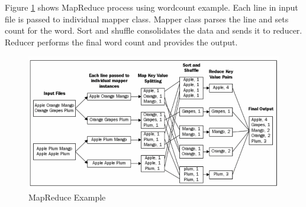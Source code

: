 \documentclass[sigconf]{acmart}
\begin{document}
Figure \ref{f:mapreduceex} shows MapReduce process using wordcount example. Each line in input file is passed to individual mapper class. Mapper class parses the line and sets count for the word. Sort and shuffle consolidates the data and sends it to reducer. Reducer performs the final word count and provides the output. 
\begin{figure}[!ht]
  \centering\includegraphics[width=\columnwidth]{images/mapReduceEx.PNG}
  \caption{MapReduce Example \cite[Ch.\ 3, p. 48]{AchariShiva2015HE}}\label{f:mapreduceex}
\end{figure}
\end{document}
